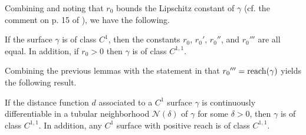 Combining \cite[Theorem 1]{Luc57} and noting that $r_0$ bounds the Lipschitz constant of $\gamma$ (cf. the comment on p. 15 of \cite{Luc57}), we have the following.
%
\begin{lemma} \label{lem:C1_properties} 
If the surface $\gamma$ is of class $C^1$, then the constants $r_0$, $r_0{'}$, $r_0{''}$, and $r_0{'''}$ are all equal.  In addition, if $r_0>0$ then  $\gamma$ is of class $C^{1,1}$.
\end{lemma}

%
%


Combining the previous lemmas with the statement in \cite[Theorem 4.18]{Fed59} that $r_0{'''}={\rm reach}(\gamma)$ yields the following result.
%
\begin{theorem} \label{t:C1_implies_C2} If the distance function $d$ associated to a $C^1$ surface $\gamma$ is continuously differentiable in a tubular neighborhood $\mathcal{N}(\delta)$ of $\gamma$ for some $\delta>0$, then $\gamma$ is of class $C^{1,1}$.  In addition, any $C^1$ surface with positive reach is of class $C^{1,1}$.  
\end{theorem}
%

